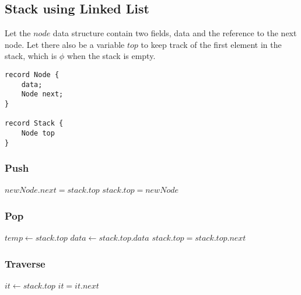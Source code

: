 \subsection{Stack using Linked List}

{\Large\color{white}
Let the $node$ data structure contain two fields,
data and the reference to the next node. Let there
also be a variable $top$ to keep track of the
first element in the stack, which is $\phi$ when the stack
is empty.

\begin{lstlisting}[style=myC]
record Node {
	data;
	Node next;
}

record Stack {
	Node top
}
\end{lstlisting}
\color{black}}

\subsubsection{Push}
{\Large\color{white}
\begin{algorithmic}[1]
			\State $newNode.next = stack.top$
		\EndIf
		\State $stack.top = newNode$
	\EndFunction
\end{algorithmic}
\color{black}}

\subsubsection{Pop}
{\Large\color{white}
\begin{algorithmic}[1]
			\State {}
		\EndIf

		\State $temp \gets stack.top$
		\State $data \gets stack.top.data$
		\State $stack.top = stack.top.next$
		\State {}
		\State {}
	\EndFunction
\end{algorithmic}
\color{black}}

\subsubsection{Traverse}
{\Large\color{white}
\begin{algorithmic}[1]
			\State {}
		\EndIf

		\State $it \gets stack.top$
			\State {}
			\State $it = it.next$
		\EndWhile
	\EndFunction
\end{algorithmic}
\color{black}}

